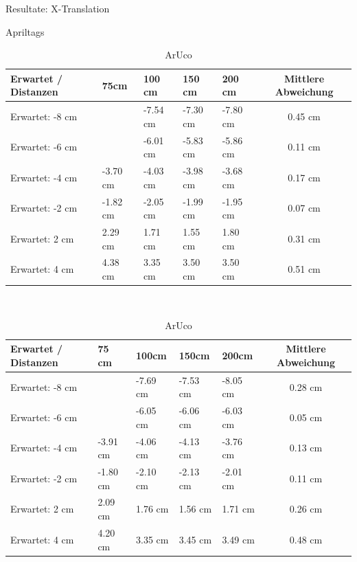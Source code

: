 \begin{table}[!htb]
    \caption{Resultate: X-Translation}
    \label{tab:xTrans}
    \begin{subtable}{\linewidth}
        \centering
        \caption{Apriltags}
        \label{tab:xTransApril}
        \begin{tabular}{|l|l|l|l|l|c|}
            \hline
            Erwartet / Distanzen & 75cm & 100 cm & 150 cm & 200 cm  & Mittlere Abweichung\\
            \hline
            Erwartet: -8 cm &          & -7.54 cm & -7.30 cm & -7.80 cm & 0.45 cm\\
            \hline
            Erwartet: -6 cm &          & -6.01 cm & -5.83 cm  & -5.86 cm & 0.11 cm\\
            \hline
            Erwartet: -4 cm & -3.70 cm & -4.03 cm & -3.98 cm & -3.68 cm & 0.17 cm\\
            \hline
            Erwartet: -2 cm & -1.82 cm & -2.05 cm & -1.99 cm & -1.95 cm & 0.07 cm\\
            \hline
            Erwartet: 2 cm  & 2.29 cm & 1.71 cm & 1.55 cm & 1.80 cm & 0.31 cm\\
            \hline
            Erwartet: 4 cm  & 4.38 cm & 3.35 cm  & 3.50 cm & 3.50 cm & 0.51 cm\\
            \hline
        \end{tabular}
    \end{subtable}
    \\[\smallskipamount]
    \begin{subtable}{\linewidth}
        \centering
        \caption{ArUco}
        \label{tab:xTransAruco}
        \begin{tabular}{|l|l|l|l|l|c|}
            \hline
            Erwartet / Distanzen & 75 cm & 100cm & 150cm & 200cm & Mittlere Abweichung\\
            \hline
            Erwartet:   -8 cm &          & -7.69 cm & -7.53 cm  & -8.05 cm & 0.28 cm\\
            \hline
            Erwartet:   -6 cm &          & -6.05 cm & -6.06 cm & -6.03 cm & 0.05 cm \\
            \hline
            Erwartet:   -4 cm & -3.91 cm & -4.06 cm & -4.13 cm & -3.76 cm & 0.13 cm \\
            \hline
            Erwartet:   -2 cm & -1.80 cm & -2.10 cm & -2.13 cm & -2.01 cm &  0.11 cm\\
            \hline
            Erwartet:   2 cm  & 2.09 cm & 1.76 cm & 1.56 cm & 1.71 cm & 0.26 cm\\
            \hline
            Erwartet:   4 cm  & 4.20 cm & 3.35 cm & 3.45 cm & 3.49 cm & 0.48 cm \\
            \hline
        \end{tabular}
    \end{subtable} 
\end{table}

